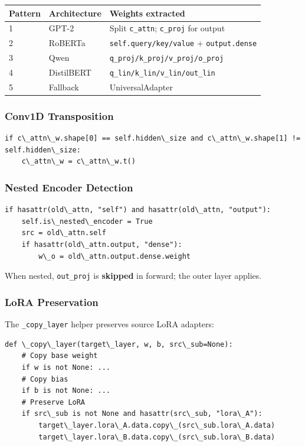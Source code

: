 \begin{table}[H]
\centering
\small
\begin{tabular}{lll}
\toprule
\textbf{Pattern} & \textbf{Architecture} & \textbf{Weights extracted} \\
\midrule
1 & GPT-2 & Split \texttt{c\_attn}; \texttt{c\_proj} for output \\
2 & RoBERTa & \texttt{self.query/key/value} + \texttt{output.dense} \\
3 & Qwen & \texttt{q\_proj/k\_proj/v\_proj/o\_proj} \\
4 & DistilBERT & \texttt{q\_lin/k\_lin/v\_lin/out\_lin} \\
5 & Fallback & UniversalAdapter \\
\bottomrule
\end{tabular}
\end{table}

\subsubsection{Conv1D Transposition}

\begin{lstlisting}
if c\_attn\_w.shape[0] == self.hidden\_size and c\_attn\_w.shape[1] != self.hidden\_size:
    c\_attn\_w = c\_attn\_w.t()
\end{lstlisting}

\subsubsection{Nested Encoder Detection}

\begin{lstlisting}
if hasattr(old\_attn, "self") and hasattr(old\_attn, "output"):
    self.is\_nested\_encoder = True
    src = old\_attn.self
    if hasattr(old\_attn.output, "dense"):
        w\_o = old\_attn.output.dense.weight
\end{lstlisting}

When nested, \texttt{out\_proj} is \textbf{skipped} in forward; the outer layer applies.

\subsubsection{LoRA Preservation}

The \texttt{\_copy\_layer} helper preserves source LoRA adapters:

\begin{lstlisting}
def \_copy\_layer(target\_layer, w, b, src\_sub=None):
    # Copy base weight
    if w is not None: ...
    # Copy bias
    if b is not None: ...
    # Preserve LoRA
    if src\_sub is not None and hasattr(src\_sub, "lora\_A"):
        target\_layer.lora\_A.data.copy\_(src\_sub.lora\_A.data)
        target\_layer.lora\_B.data.copy\_(src\_sub.lora\_B.data)
\end{lstlisting}

